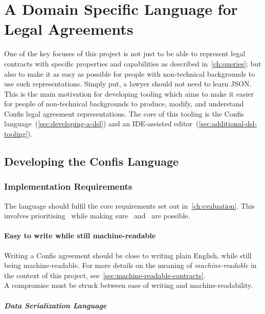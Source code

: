 \chapter{A Domain Specific Language for Legal Agreements}\label{ch:lang}

One of the key focuses of this project is not just to be able to represent legal contracts with specific properties and capabilities as described in~\autoref{ch:queries};
but also to make it as easy as possible for people with non-technical backgrounds to use such representations.
Simply put, a lawyer should not need to learn JSON.\\

This is the main motivation for developing tooling which aims to make it easier for people of non-technical backgrounds to produce, modify, and understand Confis legal agreement representations.
The core of this tooling is the Confis language~(\autoref{sec:developing-a-dsl}) and an IDE-assisted editor~(\autoref{sec:additional-dsl-tooling}).


\section{Developing the Confis Language}\label{sec:developing-a-dsl}

\subsection{Implementation Requirements}\label{subsec:dsl:requirements}

The language should fulfil the core requirements set out in~\autoref{ch:evaluation}.
This involves prioritising~ while making sure~ and~ are possible.

\subsubsection{Easy to write while still machine-readable}

Writing a Confis agreement should be close to writing plain English, while still being machine-readable.
For more details on the meaning of \emph{machine-readable} in the context of this project, see~\autoref{sec:machine-readable-contracts}.\\


A compromise must be struck between ease of writing and machine-readability.

\paragraph{Data Serialization Language}

